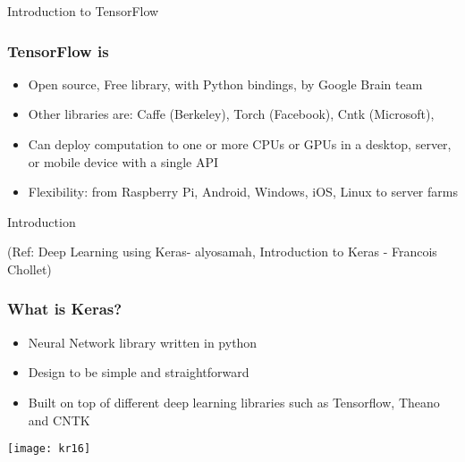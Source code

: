 \begin{frame}
  \begin{center}
    {\Large Introduction to TensorFlow}
  \end{center}
\end{frame}


\begin{frame}[fragile] \frametitle{TensorFlow is}
\begin{itemize}
\item Open source, Free library, with Python bindings, by Google Brain team
\item Other libraries are: Caffe (Berkeley), Torch (Facebook), Cntk (Microsoft),
\item Can deploy computation to one or more CPUs or GPUs in a desktop, server, or mobile device with a single API
\item Flexibility: from Raspberry Pi, Android, Windows, iOS, Linux to server farms
\end{itemize}
\end{frame}


\begin{frame}
  \begin{center}
    {\Large Introduction}
	
	\tiny{(Ref: Deep Learning using Keras- alyosamah, Introduction to Keras - Francois Chollet)}
   
  \end{center}
\end{frame} 

\begin{frame}[fragile] \frametitle{What is Keras?}

\begin{itemize}
\item  Neural Network library written in python
\item  Design to be simple and straightforward
\item  Built on top of different deep learning 
libraries such as Tensorflow, Theano and 
CNTK
\end{itemize}

\begin{center}
\texttt{[image: kr16]}
\end{center}

\end{frame}

